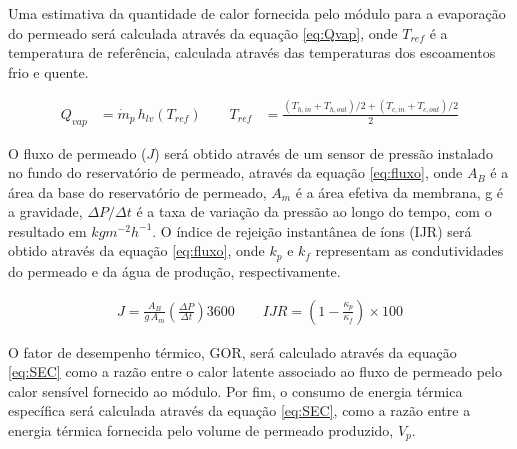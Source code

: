 Uma estimativa da quantidade de calor fornecida pelo módulo para a evaporação do permeado será calculada através da equação \ref{eq:Qvap}, onde $T_{ref}$ é a temperatura de referência, calculada através das temperaturas dos escoamentos frio e quente.

\vspace{-0.8cm}
\begin{subequations}
\renewcommand{\theequation}{\theparentequation\ (a,b)}
\begin{equation}
\begin{aligned}
Q_{vap} &= \dot{m}_p \, h_{lv}(T_{ref})
\qquad
T_{ref} &= \frac{(T_{h,in}+T_{h,out})/2 + (T_{c,in}+T_{c,out})/2}{2}
\end{aligned}
\label{eq:Qvap}
\end{equation}
\end{subequations}
\vspace{-0.8cm}

O fluxo de permeado ($J$) será obtido através de um sensor de pressão instalado no fundo do reservatório de permeado, através da equação \ref{eq:fluxo}, onde $A_B$ é a área da base do reservatório de permeado, $A_m$ é a área efetiva da membrana, g é a gravidade, $\Delta P / \Delta t$ é a taxa de variação da pressão ao longo do tempo, com o resultado em $kgm^{-2}h^{-1}$. O índice de rejeição instantânea de íons (IJR)  será obtido através da equação \ref{eq:fluxo}, onde $k_p$ e $k_f$ representam as condutividades do permeado e da água de produção, respectivamente.

\vspace{-0.8cm}
\begin{subequations}
\renewcommand{\theequation}{\theparentequation\ (a,b)}
\begin{equation}
\begin{aligned}
J = \frac{A_B}{g \, A_m}
\left( \frac{\Delta P}{\Delta t} \right)
3600
\qquad
IJR =
\left(
1 - \frac{\kappa_p}{\kappa_f}
\right)
\times 100
\end{aligned}
\label{eq:fluxo}
\end{equation}
\end{subequations}
\vspace{-0.8cm}

O fator de desempenho térmico, GOR, será calculado através da equação \ref{eq:SEC} como a razão entre o calor latente associado ao fluxo de permeado pelo calor sensível fornecido ao módulo. Por fim, o consumo de energia térmica específica será calculada através da equação \ref{eq:SEC}, como a razão entre a energia térmica fornecida pelo volume de permeado produzido, $V_p$.

